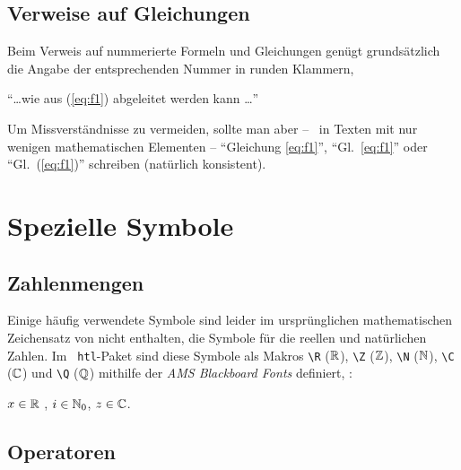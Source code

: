 \subsection{Verweise auf Gleichungen}
\label{sec:VerweiseAufGleichungen}

Beim Verweis auf nummerierte Formeln und Gleichungen genügt grundsätzlich die Angabe 
der entsprechenden Nummer in runden Klammern,
\zB\
\begin{center}
"`\ldots wie aus (\ref{eq:f1}) abgeleitet werden
kann \ldots"'
\end{center}
Um Missverständnisse zu vermeiden, sollte man aber -- \va\ in Texten mit
nur wenigen mathematischen Elementen -- "`Gleichung \ref{eq:f1}"', "`Gl.~\ref{eq:f1}"' oder "`Gl.~(\ref{eq:f1})"' schreiben (natürlich konsistent). 

\begin{center}
\setlength{\fboxrule}{0.2mm}
\setlength{\fboxsep}{2mm}
\end{center}


\section{Spezielle Symbole}

\subsection{Zahlenmengen}
Einige häufig verwendete Symbole sind leider im ursprünglichen
mathematischen Zeichensatz von \latex nicht enthalten, \zB die
Symbole für die reellen und natürlichen Zahlen. Im {\tt
htl}-Paket sind diese Symbole als Makros \verb!\R! ($\mathbb{R}$),
\verb!\Z! ($\mathbb{Z}$), \verb!\N! ($\mathbb{N}$), \verb!\C! ($\mathbb{C}$) und \verb!\Q!
($\mathbb{Q}$)
mithilfe der \emph{AMS Blackboard Fonts} definiert, \zB:
\begin{center}
$x \in \mathbb{R}$ , $i \in \mathbb{N}_0$, $z \in \mathbb{C}$.
\end{center}


\subsection{Operatoren}


